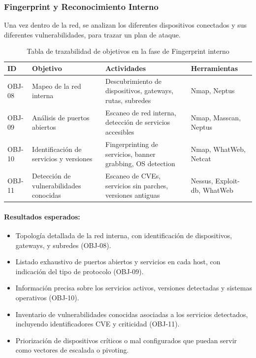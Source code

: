 \documentclass[a4paper, 10pt]{article}
\begin{document}
\clearpage

\subsubsection{Fingerprint y Reconocimiento Interno}

Una vez dentro de la red, se analizan los diferentes dispositivos conectados y sus diferentes vulnerabilidades, para trazar un plan de ataque.

\begin{table}[H]
\centering
\renewcommand{\arraystretch}{1.4}
    \begin{tabular}{|p{1.2cm}|p{3.9cm}|p{5.3cm}|p{4.2cm}|}
\hline
\textbf{ID} & \textbf{Objetivo} & \textbf{Actividades} & \textbf{Herramientas}  \\
\hline
OBJ-08 & Mapeo de la red interna & Descubrimiento de dispositivos, gateways, rutas, subredes & Nmap, Neptus  \\
\hline
OBJ-09 & Análisis de puertos abiertos & Escaneo de red interna, detección de servicios accesibles & Nmap, Masscan, Neptus  \\
\hline
OBJ-10 & Identificación de servicios y versiones & Fingerprinting de servicios, banner grabbing, OS detection & Nmap, WhatWeb, Netcat  \\
\hline
OBJ-11 & Detección de vulnerabilidades conocidas & Escaneo de CVEs, servicios sin parches, versiones antiguas & Nessus, Exploit-db, WhatWeb  \\
\hline

\end{tabular}
\caption{Tabla de trazabilidad de objetivos en la fase de Fingerprint interno}
\end{table}



\paragraph{Resultados esperados:}
\begin{itemize}
    \item Topología detallada de la red interna, con identificación de dispositivos, gateways, y subredes (OBJ-08).
    \item Listado exhaustivo de puertos abiertos y servicios en cada host, con indicación del tipo de protocolo (OBJ-09).
    \item Información precisa sobre los servicios activos, versiones detectadas y sistemas operativos (OBJ-10).
    \item Inventario de vulnerabilidades conocidas asociadas a los servicios detectados, incluyendo identificadores CVE y criticidad (OBJ-11).
    \item Priorización de dispositivos críticos o mal configurados que puedan servir como vectores de escalada o pivoting.
\end{itemize}
\end{document}
